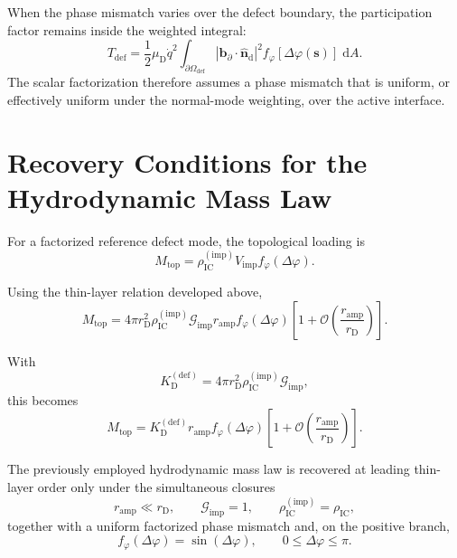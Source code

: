 When the phase mismatch varies over the defect boundary, the participation factor remains inside the weighted integral:
\begin{equation}
    T_{\mathrm{def}}
    =
    \frac{1}{2}\mu_{\mathrm D}\dot q^2
    \int_{\partial\Omega_{\mathrm{def}}}
    |\mathbf b_{\partial}\cdot\hat{\mathbf n}_{\mathrm d}|^2
    f_{\varphi}[\Delta\varphi(\boldsymbol s)]
    \;\mathrm dA.
\end{equation}
The scalar factorization therefore assumes a phase mismatch that is uniform, or effectively uniform under the normal-mode weighting, over the active interface.

\section{Recovery Conditions for the Hydrodynamic Mass Law}
\label{sec:AP_recovery_mass_law}

For a factorized reference defect mode, the topological loading is
\begin{equation}
    M_{\mathrm{top}} = \rho_{\mathrm{IC}}^{(\mathrm{imp})}V_{\mathrm{imp}}f_{\varphi}(\Delta\varphi).
\end{equation}

Using the thin-layer relation developed above,
\begin{equation}
    M_{\mathrm{top}} = 4\pi r_{\mathrm{D}}^2\rho_{\mathrm{IC}}^{(\mathrm{imp})}\mathcal{G}_{\mathrm{imp}}r_{\mathrm{amp}}f_{\varphi}(\Delta\varphi)\left[1+\mathcal{O}\left(\frac{r_{\mathrm{amp}}}{r_{\mathrm{D}}}\right)\right].
\end{equation}

With
\begin{equation}
    K_{\mathrm{D}}^{(\mathrm{def})} = 4\pi r_{\mathrm{D}}^2\rho_{\mathrm{IC}}^{(\mathrm{imp})}\mathcal{G}_{\mathrm{imp}},
\end{equation}
this becomes
\begin{equation}
    M_{\mathrm{top}} = K_{\mathrm{D}}^{(\mathrm{def})}r_{\mathrm{amp}}f_{\varphi}(\Delta\varphi)\left[1+\mathcal{O}\left(\frac{r_{\mathrm{amp}}}{r_{\mathrm{D}}}\right)\right].
\end{equation}

The previously employed hydrodynamic mass law is recovered at leading thin-layer order only under the simultaneous closures
\begin{equation}
    r_{\mathrm{amp}} \ll r_{\mathrm{D}}, \qquad \mathcal{G}_{\mathrm{imp}} = 1, \qquad \rho_{\mathrm{IC}}^{(\mathrm{imp})} = \rho_{\mathrm{IC}},
\end{equation}
together with a uniform factorized phase mismatch and, on the positive branch,
\begin{equation}
    f_{\varphi}(\Delta\varphi) = \sin(\Delta\varphi), \qquad 0 \leq \Delta\varphi \leq \pi.
\end{equation}

